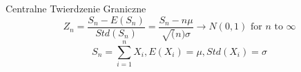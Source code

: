 \documentclass[a4paper]{article}
\begin{document}
    Centralne Twierdzenie Graniczne
    \begin{equation}
        Z_n = \frac{S_n - E(S_n)}{Std(S_n)} = \frac{S_n - n \mu}{\sqrt(n) \sigma} \rightarrow N(0,1) \text{ for } n \text{ to } \infty
    \end{equation}
    \begin{equation*}
        S_n = \sum_{i=1}^n X_i, E(X_i) = \mu, Std(X_i) = \sigma
    \end{equation*}
\end{document}
